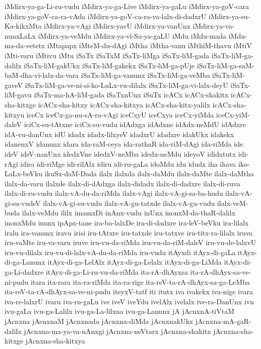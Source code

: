{iMdirx-ya-ga-Li-ru-vudu
iMdirx-ya-ga-Live
iMdirx-ya-gaLu
iMdirx-ya-goV-cara
iMdirx-ya-goV-ca-ra-vAda
iMdirx-ya-goV-ca-ra-va-lalx-di-dadxrU
iMdirx-ya-su-Ka-kikxMta
iMdirx-ya-vAgi
iMdirx-yavU
iMdirx-ya-vanUnx
iMdirx-ya-va-nunxLaLx
iMdirx-ya-veMdu
iMdirx-ya-vi-Sa-ya-gaLU
iMdu
iMdu-mada
iMdu-ma-da-vetetx
iMtapapx
iMteM-du-dAgi
iMtha
iMtha-vanu
iMthiM-thavu
iMtiV
iMti-varu
iMtivu
iMtu
iSaTx
iSaTxM
iSaTx-liMga
iSaTx-liM-gada
iSaTx-liM-ga-dalilx
iSaTx-liM-gakUkx
iSaTx-liM-gakekx
iSaTx-liM-ga-pUje
iSaTx-liM-ga-saM-baM-dha-vi-lalx-da-vara
iSaTx-liM-ga-vanunx
iSaTx-liM-ga-veMba
iSaTx-liM-gaveV
iSaTx-liM-ga-ve-ni-si-ko-LuLx-vu-dilalx
iSaTx-liM-ga-vi-lalx-deyU
iSaTx-liM-gavu
iSaTx-ma-hA-liM-gada
iSaTxnUnx
iSuTx
icACx
icACx-shakitx
icACx-sha-kitxge
icACx-sha-kitxy
icACx-sha-kitxya
icACx-sha-kitx-yalilx
icACx-sha-kitxyu
iceCx
iceCx-ga-nu-sA-ra-vAgi
iceCxyU
iceCxya
iceCx-yiMda
iceCx-yiM-daleV
iciCx-su-tAtxne
iciCx-su-vudu
idAdxga
idAdxne
idAdx-neMdU
idAdxre
idA-vu-danUnx
idU
idadx
idadx-lilxyeV
idadxrU
idadxre
idakUkx
idakekx
idanenxV
idanunx
idara
ida-raM-ceya
ida-rathaR
ida-riM-dAgi
ida-riMda
ide
ideV
ideV-nanUnx
idedxVne
idedxV-neMba
idedx-neMdu
ideyoV
ididxtutx
idi-rAgi
idira
idi-riMge
idi-rilAlx
idiru
idi-ru-gaLa
idoMdu
idu
idudx
iha
ihava
iko-LaLx-beVku
ikuSx-daM-Dada
ilalx
ilalxda
ilalx-daMdu
ilalx-daMte
ilalx-daMtha
ilalx-da-varu
ilalxde
ilalx-di-dAdxga
ilalx-didadx
ilalx-di-dadxre
ilalx-di-ruva
ilalx-di-ru-vudu
ilalx-vA-du-da-riMda
ilalx-vAgi
ilalx-vA-gi-sa-ba-hudu
ilalx-vA-gi-su-vudeV
ilalx-vA-gi-su-vudu
ilalx-vA-gu-tatxde
ilalx-vA-gu-vudu
ilalx-veM-buda
ilalx-veMdu
ililx
imamxDi
inAnx-vudu
inUnx
inonxM-da-thaR-dalilx
inonxMdu
inunx
ipApx-tane
ira-ba-lalxDe
ira-di-dadxre
ira-leV-beVku
ira-lilalx
iralu
ira-vanunx
iravu
irisi
iru-tAtxre
iru-tatxde
iru-tatxve
iru-titx-ra-lilalx
iruva
iru-vaMte
iru-va-varu
iruve
iru-vu-da-riMda
iru-vu-da-riM-daleV
iru-vu-de-lalxvU
iru-vu-dilalx
iru-vu-di-lalx-vA-du-da-riMda
iru-vudu
itAyxdi
itAyx-di-gaLa
itAyx-di-ga-Lanunx
itAyx-di-ga-LelAlx
itAyx-di-ga-Lelalx
itAyx-di-ga-LiMda
itAyx-di-ga-Li-dadxre
itAyx-di-ga-Li-ru-vu-da-riMda
ita-rA-dhAyxsa
ita-rA-dhAyx-sa-ve-ni-pudu
itara
ita-rara
ita-ra-riMda
ita-ra-rige
ita-reV-ta-rA-dhAyx-sa-ga-LeMba
ita-reV-ta-rA-dhAyx-sa-ve-ni-pudu
iteyxV-tatf
iti
itutx
iva
ivakekx
iva-nige
ivara
iva-re-lalxrU
ivaru
iva-ru-gaLu
ive
iveV
iveYdu
ivelAlx
ivelalx
ive-ra-DanUnx
ivu
ivu-gaLa
ivu-ga-Lalilx
ivu-ga-La-lilxna
ivu-ga-Lanunx
jA
jAcnxnA-tiVtaM
jAcnxna
jAcnxnaM
jAcnxnada
jAcnxna-diMda
jAcnxnakUkx
jAcnxna-mA-gaR-dalilx
jAcnxna-ma-ya-va-nAnxgi
jAcnxna-neVtarx
jAcnxna-shakitx
jAcnxna-sha-kitxge
jAcnxna-sha-kitxya
}
